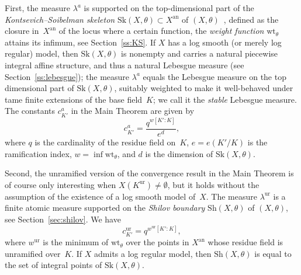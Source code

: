 \documentclass[JEP,XML,SOM,Unicode,NoFloatCountersInSection]{cedram}
\theoremstyle{definition}
\numberwithin{equation}{subsection}
\newcommand{\an}{\mathrm{an}}
\newcommand{\Sh}{\mathrm{Sh}}
\newcommand{\Sk}{\mathrm{Sk}}
\newcommand{\ur}{\mathrm{ur}}
\newcommand{\wt}{\mathrm{wt}}
\let\form\theta
\let\Leb\lambda
\begin{document}
First, the measure $\Leb^a$ is supported on the top-dimensional part of the {\em Kontsevich--Soibelman skeleton} $\Sk(X,\form)\subset X^{\an}$ of $(X,\form)$~\cite{KS,MuNi}, defined as the closure in~$X^{\an}$ of the locus where a certain function, the \emph{weight function} $\wt_\form$ attains its infimum, see Section~\ref{ss:KS}.
If $X$ has a log smooth (or merely log regular) model, then $\Sk(X,\form)$ is nonempty and carries a natural piecewise integral affine structure, and thus a natural Lebesgue measure (see Section~\ref{ss:lebesgue}); the measure $\Leb^a$ equals the Lebesgue measure on the top dimensional part of $\Sk(X,\form)$, suitably
weighted to make it well-behaved under tame finite extensions of the base field~$K$; we call it the \emph{stable} Lebesgue measure. The constants $c_{K'}^a$ in the Main Theorem are given by
\begin{equation*}
c_{K'}^a=\frac{q^{w[K':K]}}{e^d},
\end{equation*}
where $q$ is the cardinality of the residue field on~$K$, $e=e(K'/K)$ is the ramification index, $w=\inf\wt_\form$, and $d$ is the dimension of $\Sk(X,\form)$.

Second, the unramified version of the convergence result in the Main Theorem is of course only interesting when $X(K^{\ur})\ne\emptyset$, but it holds without the assumption of the existence of a log smooth model of~$X$. The measure $\Leb^{\ur}$ is a finite atomic measure supported on the \emph{Shilov boundary} $\Sh(X,\form)$ of $(X,\form)$, see Section~\ref{sec:shilov}.
We have
\begin{equation*}
c_{K'}^{\ur}=q^{w^{\ur}[K':K]},
\end{equation*}
where $w^{\ur}$ is the minimum of $\wt_\form$ over the points in $X^{\an}$ whose residue field is unramified over~$K$.
If $X$ admits a log regular model, then $\Sh(X,\form)$ is equal to
the set of integral points of $\Sk(X,\form)$.
\end{document}
